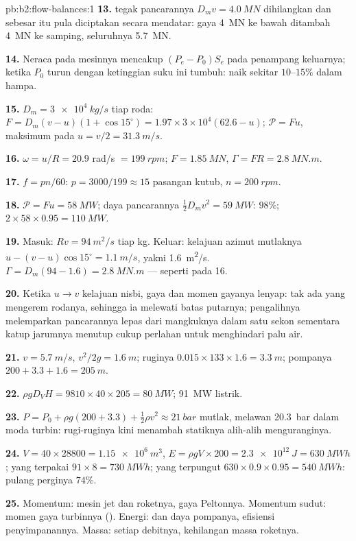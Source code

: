 \begin{solution}{pb:b2:flow-balances:1}
\textbf{13.}  tegak pancarannya $D_mv = \qty{4.0}{MN}$
dihilangkan dan sebesar itu pula diciptakan secara mendatar: gaya \qty{4}{MN} ke bawah
ditambah \qty{4}{MN} ke samping, seluruhnya \qty{5.7}{MN}.

\textbf{14.} Neraca pada mesinnya mencakup $(P_e - P_0)S_e$ pada
penampang keluarnya; ketika $P_0$ turun dengan ketinggian suku ini tumbuh: 
naik sekitar $10$--$15\%$ dalam hampa.

\textbf{15.} $D_m = \qty{3e4}{kg/s}$ tiap roda: $F = D_m(v - u)(1 + \cos15^\circ) =
1.97 \times 3 \times 10^4(62.6 - u)$; $\mathcal P = Fu$, maksimum pada $u = v/2 = \qty{31.3}{m/s}$.

\textbf{16.} $\omega = u/R = 20.9$ rad/s $= \qty{199}{rpm}$; $F = \qty{1.85}{MN}$, $\Gamma = FR
= \qty{2.8}{MN.m}$.

\textbf{17.} $f = pn/60$: $p = 3000/199 \approx 15$ pasangan kutub, $n = \qty{200}{rpm}$.

\textbf{18.} $\mathcal P = Fu = \qty{58}{MW}$; daya pancarannya $\tfrac12D_mv^2 = \qty{59}{MW}$:
$98\%$; $2 \times 58 \times 0.95 = \qty{110}{MW}$.

\textbf{19.} Masuk: $Rv = \qty{94}{m^2/s}$ tiap kg. Keluar: kelajuan azimut mutlaknya
$u - (v - u)\cos15^\circ = \qty{1.1}{m/s}$, yakni \qty{1.6}{m^2/s}. $\Gamma = D_m(94 -
1.6) = \qty{2.8}{MN.m}$ --- seperti pada 16.

\textbf{20.} Ketika $u \to v$ kelajuan nisbi, gaya dan momen gayanya
lenyap: tak ada yang mengerem rodanya, sehingga ia melewati batas putarnya; pengalihnya
melemparkan pancarannya lepas dari mangkuknya dalam satu sekon sementara katup jarumnya
menutup cukup perlahan untuk menghindari palu air.

\textbf{21.} $v = \qty{5.7}{m/s}$, $v^2/2g = \qty{1.6}{m}$; ruginya $0.015 \times 133 \times 1.6 =
\qty{3.3}{m}$;  pompanya $200 + 3.3 + 1.6 = \qty{205}{m}$.

\textbf{22.} $\rho gD_VH = 9810 \times 40 \times 205 = \qty{80}{MW}$; \qty{91}{MW} listrik.

\textbf{23.} $P = P_0 + \rho g(200 + 3.3) + \tfrac12\rho v^2 \approx \qty{21}{bar}$ mutlak,
melawan \qty{20.3}{bar} dalam moda turbin: rugi-ruginya kini menambah
 statiknya alih-alih menguranginya.

\textbf{24.} $V = 40 \times 28800 = \qty{1.15e6}{m^3}$, $E = \rho gV \times 200 = \qty{2.3e12}{J}
= \qty{630}{MWh}$; yang terpakai $91 \times 8 = \qty{730}{MWh}$; yang terpungut $630 \times 0.9 \times
0.95 = \qty{540}{MWh}$: pulang perginya $74\%$.

\textbf{25.} Momentum:  mesin jet dan roketnya, gaya
Peltonnya. Momentum sudut: momen gaya turbinnya (). Energi:
 dan daya pompanya, efisiensi penyimpanannya. Massa: setiap debitnya,
kehilangan massa roketnya.
\end{solution}

